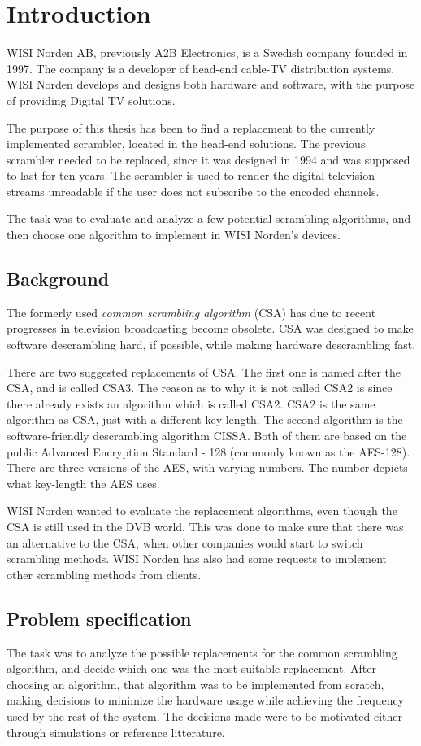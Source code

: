 \chapter{Introduction}
WISI Norden AB, previously A2B Electronics, is a Swedish company 
founded in 1997. The company is a developer of head-end cable-TV 
distribution systems. WISI Norden develops and designs both hardware 
and software, with the purpose of providing Digital TV solutions. 

The purpose of this thesis has been to find a replacement to the 
currently implemented scrambler, located in the head-end solutions. The
previous scrambler needed to be replaced, since it was designed in 
1994 and was supposed to last for ten years. The scrambler is used to 
render the digital television streams unreadable if the user does not 
subscribe to the encoded channels. 

The task was to evaluate and analyze a few potential scrambling 
algorithms, and then choose one algorithm to implement in WISI 
Norden's devices.

\section{Background}
The formerly used \emph{common scrambling algorithm} (CSA) has due to 
recent progresses in television broadcasting become obsolete. CSA was 
designed to make software descrambling hard, if possible, while making 
hardware descrambling fast. 

There are two suggested replacements of CSA. The first one is named 
after the CSA, and is called CSA3. The reason as to why it is not 
called CSA2 is since there already exists an algorithm which is 
called CSA2. CSA2 is the same algorithm as CSA, just with a different
key-length. The second algorithm is the software-friendly descrambling 
algorithm CISSA. Both of them are based on the public Advanced 
Encryption Standard - 128 (commonly known as the AES-128). There are 
three versions of the AES, with varying numbers. The number depicts 
what key-length the AES uses.

WISI Norden wanted to evaluate the replacement algorithms, even 
though the CSA is still used in the DVB world. This was done to make 
sure that there was an alternative to the CSA, when other companies 
would start to switch scrambling methods. WISI Norden has also had some 
requests to implement other scrambling methods from clients.

\section{Problem specification}
The task was to analyze the possible replacements for the common 
scrambling algorithm, and decide which one was the most suitable 
replacement. After choosing an algorithm, that algorithm was to be 
implemented from scratch, making decisions to minimize the hardware 
usage while achieving the frequency used by the rest of the system. 
The decisions made were to be motivated either through simulations or 
reference litterature.

